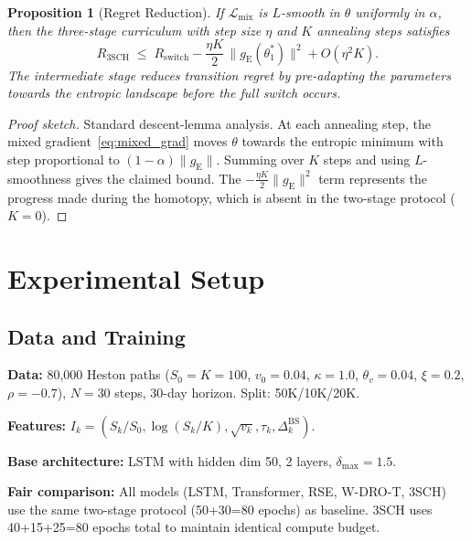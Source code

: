 \documentclass[11pt]{article}
\newtheorem{proposition}[theorem]{Proposition}
\begin{document}
\begin{proposition}[Regret Reduction]
\label{prop:regret}
If $\mathcal{L}_{\mathrm{mix}}$ is $L$-smooth in $\theta$ uniformly in $\alpha$, then the three-stage curriculum with step size $\eta$ and $K$ annealing steps satisfies
\begin{equation}
    R_{\mathrm{3SCH}} \;\le\; R_{\mathrm{switch}} - \frac{\eta K}{2}\,\|g_{\mathrm{E}}(\theta_1^*)\|^2 + O(\eta^2 K).
    \label{eq:regret}
\end{equation}
The intermediate stage reduces transition regret by pre-adapting the parameters towards the entropic landscape before the full switch occurs.
\end{proposition}

\begin{proof}[Proof sketch]
Standard descent-lemma analysis.  At each annealing step, the mixed gradient~\eqref{eq:mixed_grad} moves $\theta$ towards the entropic minimum with step proportional to $(1-\alpha)\|g_{\mathrm{E}}\|$.  Summing over $K$ steps and using $L$-smoothness gives the claimed bound.  The $-\frac{\eta K}{2}\|g_{\mathrm{E}}\|^2$ term represents the progress made during the homotopy, which is absent in the two-stage protocol ($K=0$).
\end{proof}

\section{Experimental Setup}
\label{sec:experiments}

\subsection{Data and Training}

\textbf{Data:} 80,000 Heston paths ($S_0 = K = 100$, $v_0 = 0.04$, $\kappa = 1.0$, $\theta_v = 0.04$, $\xi = 0.2$, $\rho = -0.7$), $N = 30$ steps, 30-day horizon. Split: 50K/10K/20K.

\textbf{Features:} $I_k = (S_k/S_0, \log(S_k/K), \sqrt{v_k}, \tau_k, \Delta_k^{\text{BS}})$.

\textbf{Base architecture:} LSTM with hidden dim 50, 2 layers, $\delta_{\max} = 1.5$.

\textbf{Fair comparison:} All models (LSTM, Transformer, RSE, W-DRO-T, 3SCH) use the same two-stage protocol (50+30=80 epochs) as baseline. 3SCH uses 40+15+25=80 epochs total to maintain identical compute budget.
\end{document}

